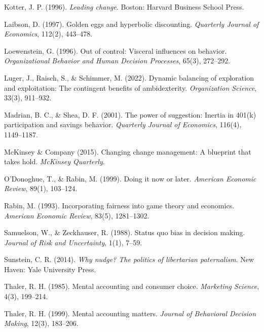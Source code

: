 \documentclass[11pt,a4paper]{article}
\begin{document}
\vspace{0.3cm}
Kotter, J. P. (1996). \textit{Leading change}. Boston: Harvard Business School Press.

\vspace{0.3cm}
Laibson, D. (1997). Golden eggs and hyperbolic discounting. \textit{Quarterly Journal of Economics}, 112(2), 443--478.

\vspace{0.3cm}
Loewenstein, G. (1996). Out of control: Visceral influences on behavior. \textit{Organizational Behavior and Human Decision Processes}, 65(3), 272--292.

\vspace{0.3cm}
Luger, J., Raisch, S., \& Schimmer, M. (2022). Dynamic balancing of exploration and exploitation: The contingent benefits of ambidexterity. \textit{Organization Science}, 33(3), 911--932.

\vspace{0.3cm}
Madrian, B. C., \& Shea, D. F. (2001). The power of suggestion: Inertia in 401(k) participation and savings behavior. \textit{Quarterly Journal of Economics}, 116(4), 1149--1187.

\vspace{0.3cm}
McKinsey \& Company (2015). Changing change management: A blueprint that takes hold. \textit{McKinsey Quarterly}.

\vspace{0.3cm}
O'Donoghue, T., \& Rabin, M. (1999). Doing it now or later. \textit{American Economic Review}, 89(1), 103--124.

\vspace{0.3cm}
Rabin, M. (1993). Incorporating fairness into game theory and economics. \textit{American Economic Review}, 83(5), 1281--1302.

\vspace{0.3cm}
Samuelson, W., \& Zeckhauser, R. (1988). Status quo bias in decision making. \textit{Journal of Risk and Uncertainty}, 1(1), 7--59.

\vspace{0.3cm}
Sunstein, C. R. (2014). \textit{Why nudge? The politics of libertarian paternalism}. New Haven: Yale University Press.

\vspace{0.3cm}
Thaler, R. H. (1985). Mental accounting and consumer choice. \textit{Marketing Science}, 4(3), 199--214.

\vspace{0.3cm}
Thaler, R. H. (1999). Mental accounting matters. \textit{Journal of Behavioral Decision Making}, 12(3), 183--206.
\end{document}
